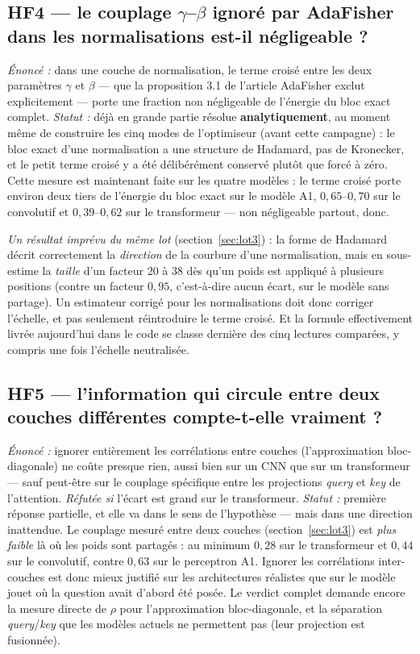 \documentclass[11pt,a4paper]{article}
\newcommand{\eng}[1]{\emph{#1}}
\begin{document}
\subsection*{HF4 — le couplage $\gamma$--$\beta$ ignoré par AdaFisher dans les normalisations est-il négligeable ?}
\textit{Énoncé :} dans une couche de normalisation, le terme croisé entre les deux paramètres
$\gamma$ et $\beta$ — que la proposition 3.1 de l'article AdaFisher exclut explicitement — porte une
fraction non négligeable de l'énergie du bloc exact complet. \textit{Statut :} déjà en grande partie
résolue \textbf{analytiquement}, au moment même de construire les cinq modes de l'optimiseur (avant
cette campagne) : le bloc exact d'une normalisation a une structure de Hadamard, pas de Kronecker, et
le petit terme croisé y a été délibérément conservé plutôt que forcé à zéro. Cette mesure est
maintenant faite sur les quatre modèles : le terme croisé porte environ deux tiers de l'énergie du
bloc exact sur le modèle A1, $0{,}65$--$0{,}70$ sur le convolutif et $0{,}39$--$0{,}62$ sur le
transformeur — non négligeable partout, donc.

\textit{Un résultat imprévu du même lot} (section~\ref{sec:lot3}) : la forme de Hadamard décrit
correctement la \emph{direction} de la courbure d'une normalisation, mais en sous-estime la
\emph{taille} d'un facteur 20 à 38 dès qu'un poids est appliqué à plusieurs positions (contre un
facteur $0{,}95$, c'est-à-dire aucun écart, sur le modèle sans partage). Un estimateur corrigé pour
les normalisations doit donc corriger l'échelle, et pas seulement réintroduire le terme croisé. Et
la formule effectivement livrée aujourd'hui dans le code se classe dernière des cinq lectures
comparées, y compris une fois l'échelle neutralisée.

\subsection*{HF5 — l'information qui circule entre deux couches différentes compte-t-elle vraiment ?}
\textit{Énoncé :} ignorer entièrement les corrélations entre couches (l'approximation
bloc-diagonale) ne coûte presque rien, aussi bien sur un CNN que sur un transformeur — sauf peut-être
sur le couplage spécifique entre les projections \eng{query} et \eng{key} de l'attention. \textit{Réfutée
si} l'écart est grand sur le transformeur. \textit{Statut :} première réponse partielle, et elle va
dans le sens de l'hypothèse — mais dans une direction inattendue. Le couplage mesuré entre deux
couches (section~\ref{sec:lot3}) est \emph{plus faible} là où les poids sont partagés : au minimum
$0{,}28$ sur le transformeur et $0{,}44$ sur le convolutif, contre $0{,}63$ sur le perceptron A1.
Ignorer les corrélations inter-couches est donc mieux justifié sur les architectures réalistes que
sur le modèle jouet où la question avait d'abord été posée. Le verdict complet demande encore la
mesure directe de $\rho$ pour l'approximation bloc-diagonale, et la séparation \eng{query}/\eng{key}
que les modèles actuels ne permettent pas (leur projection est fusionnée).
\end{document}
